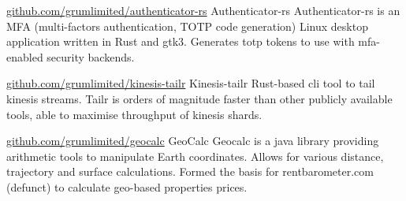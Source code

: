 

\begin{cventries}

    \cventry
    {\href{https://github.com/grumlimited/authenticator-rs}{github.com/grumlimited/authenticator-rs}} %
    {\hspace{0.2em}Authenticator-rs} %
    {} %
    {} %
    {}
    {
        Authenticator-rs is an MFA (multi-factors authentication, TOTP code generation) Linux desktop application written in Rust and gtk3. Generates totp tokens to use with mfa-enabled security backends.
    }

    \cventry
    {\href{https://github.com/grumlimited/kinesis-tailr}{github.com/grumlimited/kinesis-tailr}} %
    {\hspace{0.2em}Kinesis-tailr} %
    {} %
    {} %
    {}
    {
        Rust-based cli tool to tail kinesis streams. Tailr is orders of magnitude faster than other publicly available tools, able to maximise throughput of kinesis shards.
    }


    \cventry
    {\href{https://github.com/grumlimited/geocalc}{github.com/grumlimited/geocalc}} %
    {\hspace{0.2em}GeoCalc} %
    {} %
    {} %
    {}
    {
        Geocalc is a java library providing arithmetic tools to manipulate Earth coordinates. Allows for various distance, trajectory and surface calculations. Formed the basis for rentbarometer.com (defunct) to calculate geo-based properties prices.
    }

\end{cventries}
